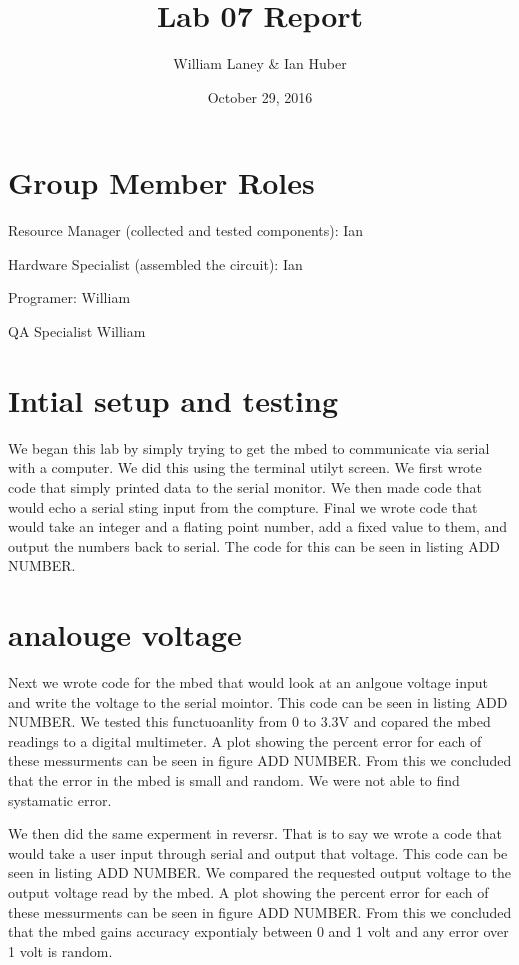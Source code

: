 \documentclass[prl,12pt,notitlepage,aps,onecolumn,superscriptaddress]{revtex4-1}
\begin{document}
\title{Lab 07 Report}
\author{William Laney \& Ian Huber}
\date{October 29, 2016}
\maketitle

\section{Group Member Roles}
Resource Manager (collected and tested components): Ian

Hardware Specialist (assembled the circuit): Ian

Programer: William

QA Specialist William

\section{Intial setup and testing}
We began this lab by simply trying to get the mbed to communicate via serial with a computer. We did this using the terminal utilyt screen. We first wrote code that simply printed data to the serial monitor. We then made code that would echo a serial sting input from the compture. Final we wrote code that would take an integer and a flating point number, add a fixed value to them, and output the numbers back to serial. The code for this can be seen in listing ADD NUMBER. 

\section{analouge voltage}
Next we wrote code for the mbed that would look at an anlgoue voltage input and write the voltage to the serial mointor. This code can be seen in listing ADD NUMBER. We tested this functuoanlity from 0 to 3.3V and copared the mbed readings to a digital multimeter. A plot showing the percent error for each of these messurments can be seen in figure ADD NUMBER. From this we concluded that the error in the mbed is small and random. We were not able to find systamatic error.

We then did the same experment in reversr. That is to say we wrote a code that would take a user input through serial and output that voltage. This code can be seen in listing ADD NUMBER. We compared the requested output voltage to the output voltage read by the mbed. A plot showing the percent error for each of these messurments can be seen in figure ADD NUMBER. From this we concluded that the mbed gains accuracy expontialy between 0 and 1 volt and any error over 1 volt is random. 
\end{document}
